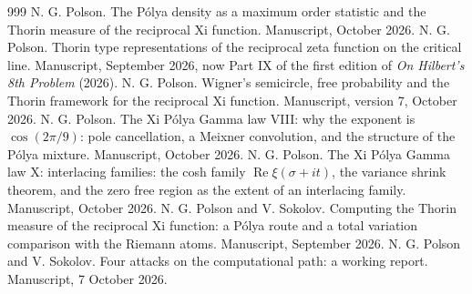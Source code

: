 \begin{thebibliography}{999}
 N. G. Polson. The P\'olya density as a maximum order statistic and the Thorin measure of the reciprocal Xi function. Manuscript, October 2026.
 N. G. Polson. Thorin type representations of the reciprocal zeta function on the critical line. Manuscript, September 2026, now Part IX of the first edition of \emph{On Hilbert's 8th Problem} (2026).
 N. G. Polson. Wigner's semicircle, free probability and the Thorin framework for the reciprocal Xi function. Manuscript, version 7, October 2026.
 N. G. Polson. The Xi P\'olya Gamma law VIII: why the exponent is $\cos(2\pi/9)$: pole cancellation, a Meixner convolution, and the structure of the P\'olya mixture. Manuscript, October 2026.
 N. G. Polson. The Xi P\'olya Gamma law X: interlacing families: the cosh family $\operatorname{Re}\xi(\sigma+it)$, the variance shrink theorem, and the zero free region as the extent of an interlacing family. Manuscript, October 2026.
 N. G. Polson and V. Sokolov. Computing the Thorin measure of the reciprocal Xi function: a P\'olya route and a total variation comparison with the Riemann atoms. Manuscript, September 2026.
 N. G. Polson and V. Sokolov. Four attacks on the computational path: a working report. Manuscript, 7 October 2026.

\end{thebibliography}
